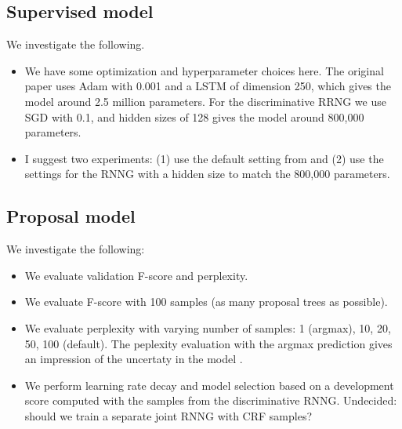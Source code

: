 \subsection{Supervised model} We investigate the following.
\begin{itemize}
  \item We have some optimization and hyperparameter choices here. The original paper uses Adam with 0.001 and a LSTM of dimension 250, which gives the model around 2.5 million parameters. For the discriminative RRNG we use SGD with 0.1, and hidden sizes of 128 gives the model around 800,000 parameters.
  \item I suggest two experiments: (1) use the default setting from \citep{stern2017minimal} and (2) use the settings for the RNNG with a hidden size to match the 800,000 parameters.
\end{itemize}

\subsection{Proposal model} We investigate the following:
\begin{itemize}
  \item We evaluate validation F-score and perplexity.
  \item We evaluate F-score with 100 samples (as many proposal trees as possible).
  \item We evaluate perplexity with varying number of samples: 1 (argmax), 10, 20, 50, 100 (default). The peplexity evaluation with the argmax prediction gives an impression of the uncertaty in the model \citep{buys2018exact}.
  \item  We perform learning rate decay and model selection based on a development score computed with the samples from the discriminative RNNG. Undecided: should we train a separate joint RNNG with CRF samples?
\end{itemize}

